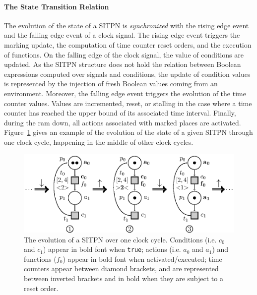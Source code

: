 \documentclass[pdflatex,sn-mathphys]{sn-jnl}%
\theoremstyle{thmstyleone}%
\theoremstyle{thmstyletwo}%
\theoremstyle{thmstylethree}%
\begin{document}
\paragraph{The State Transition Relation}

The evolution of the state of a SITPN is \textit{synchronized} with
the rising edge event and the falling edge event of a clock signal.
The rising edge event triggers the marking update, the computation of
time counter reset orders, and the execution of functions. On the
falling edge of the clock signal, the value of conditions are
updated. As the SITPN structure does not hold the relation between
Boolean expressions computed over \vhdl{} signals and conditions, the
update of condition values is represented by the injection of fresh
Boolean values coming from an environment. Moreover, the falling edge
event triggers the evolution of the time counter values. Values are
incremented, reset, or stalling in the case where a time counter has
reached the upper bound of its associated time interval. Finally,
during the ram down, all actions associated with marked places are
activated. Figure~\ref{fig:sitpn-state-exec} gives an example of the
evolution of the state of a given SITPN through one clock cycle,
happening in the middle of other clock cycles.

\begin{figure}[H]
  \centering
  \includegraphics[keepaspectratio=true, width=.8\textwidth]{sitpn-state-evol.eps}
  \caption[Evolution of a SITPN over one clock cycle.]{The evolution
    of a SITPN over one clock cycle. Conditions (i.e. $c_0$ and $c_1$)
    appear in bold font when \texttt{true}; actions (i.e. $a_0$ and
    $a_1$) and functions ($f_0$) appear in bold font when
    activated/executed; time counters appear between diamond brackets,
    and are represented between inverted brackets and in bold when
    they are subject to a reset order.}
  \label{fig:sitpn-state-exec}
\end{figure}
\end{document}
